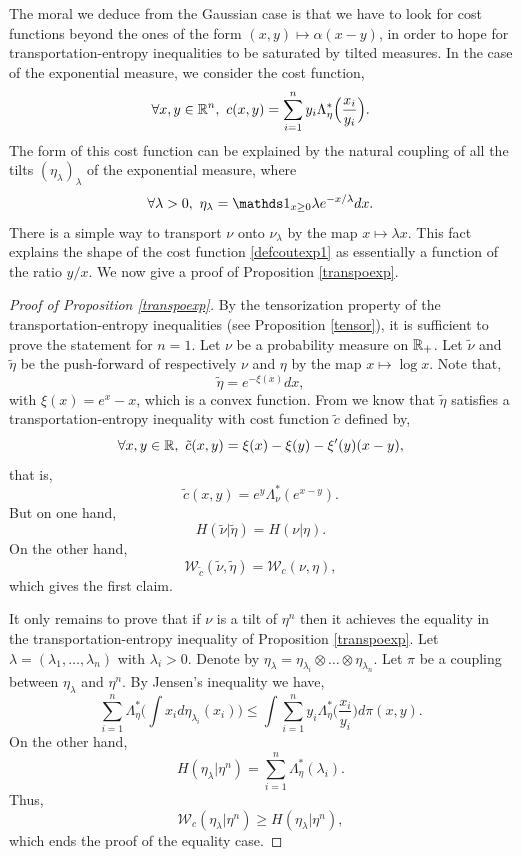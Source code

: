 \documentclass[a4paper,oneside,11pt]{article}
\begin{document}
The moral we deduce from the Gaussian case is that we have to look for cost functions beyond the ones of the form $(x,y)\mapsto \alpha(x-y)$, in order to hope for transportation-entropy inequalities to be saturated by tilted measures. 
In the case of the exponential measure, we consider the cost function,
\begin{equation} \label{defcoutexp1}\forall x,y \in \RR^n, \ c(x,y) = \sum_{i=1}^n  y_i \Lambda^*_{\eta}\Big( \frac{x_i}{y_i}\Big).\end{equation}
The form of this cost function can be explained by the natural coupling of all the tilts $(\eta_\lambda)_\lambda$ of the exponential measure, where 
$$  \forall \lambda >0, \ \eta_{\lambda} = \Car_{x\geq 0} \lambda e^{-x/\lambda} dx.$$
There is a simple way to transport $\nu$ onto $\nu_{\lambda}$ by the map $x \mapsto \lambda x$. This fact explains the shape of the cost function \eqref{defcoutexp1} as essentially a function of the ratio $y/x$. 
We now give a proof of Proposition \ref{transpoexp}.
\begin{proof}[Proof of Proposition \ref{transpoexp}] 
By the tensorization property of the transportation-entropy inequalities (see Proposition \ref{tensor}), it is sufficient to prove the statement for $n=1$. Let $\nu$ be a probability measure on $\mathbb{R}_+$. 
Let $\tilde \nu$ and $\tilde \eta$ be the push-forward of respectively $\nu$ and $\eta$ by the map $x \mapsto \log x$. Note that, 
$$ \tilde \eta = e^{-\xi(x)} dx,$$
with $\xi(x) = e^x-x$, which is a convex function. 
From \cite{Talagrand2} we know that $\tilde \eta$ satisfies a transportation-entropy inequality with cost function $\tilde{c}$ defined by,
$$ \forall x,y \in \RR,\ \tilde{c}(x,y) =  \xi(x) - \xi(y) -\xi'(y)(x-y),$$
that is,
$$ \tilde c(x,y) = e^y \Lambda^*_\nu(e^{x-y}).$$ 
But on one hand,
$$ H(\tilde \nu | \tilde \eta) = H( \nu | \eta).$$
On the other hand,
$$ \mathcal{W}_{\tilde c}(\tilde \nu , \tilde \eta) = \mathcal{W}_c(\nu, \eta),$$
which gives the first claim.


It only remains to prove that if $\nu$ is a tilt of $\eta^n$ then it achieves the equality in the transportation-entropy inequality of Proposition \ref{transpoexp}. Let $\lambda = (\lambda_1,\ldots,\lambda_n)$ with $\lambda_i >0$. Denote by $\eta_\lambda = \eta_{\lambda_i} \otimes \ldots \otimes \eta_{\lambda_n}$. Let $\pi$ be a coupling between $\eta_\lambda$ and $\eta^n$. By Jensen's inequality we have,
$$ \sum_{i=1}^n \Lambda^*_\eta\big( \int x_i d\eta_{\lambda_i}(x_i)\big) \leq \int \sum_{i=1}^n y_i \Lambda^*_\eta\Big( \frac{x_i}{y_i}\Big) d\pi(x,y).$$
On the other hand,
$$ H( \eta_{\lambda}| \eta^n) = \sum_{i=1}^n \Lambda^*_\eta(\lambda_i).$$
Thus, 
$$ \mathcal{W}_c(\eta_\lambda| \eta^n) \geq H(\eta_\lambda| \eta^n),$$
which ends the proof of the equality case.
\end{proof}
\end{document}
